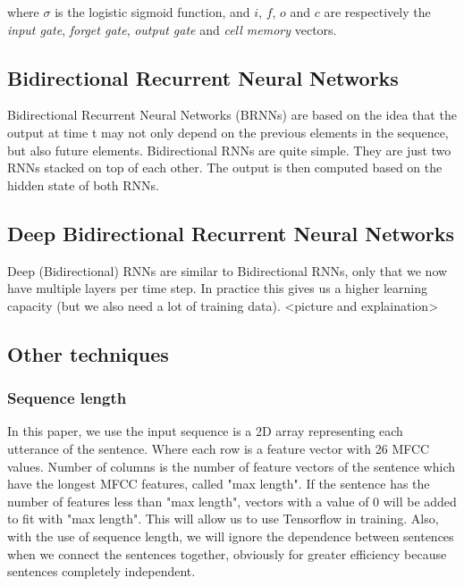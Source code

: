 \documentclass[conference]{IEEEtran}
\begin{document}
where $\sigma$ is the logistic sigmoid function, and $i$, $f$, $o$ and $c$ are respectively the \textit{input gate}, \textit{forget gate}, \textit{output gate} and \textit{cell memory} vectors.









\subsection{Bidirectional Recurrent Neural Networks}
Bidirectional Recurrent Neural Networks (BRNNs) are based on the idea that the output at time t may not only depend on the previous elements in the sequence, but also future elements. Bidirectional RNNs are quite simple. They are just two RNNs stacked on top of each other. The output is then computed based on the hidden state of both RNNs.




\subsection{Deep Bidirectional Recurrent Neural Networks}
Deep (Bidirectional) RNNs are similar to Bidirectional RNNs, only that we now have multiple layers per time step. In practice this gives us a higher learning capacity (but we also need a lot of training data).
<picture and explaination>

\subsection{Other techniques}
\subsubsection{Sequence length}

In this paper, we use the input sequence is a 2D array representing each utterance of the sentence. Where each row is a feature vector with 26 MFCC values. Number of columns is the number of feature vectors of the sentence which have the longest MFCC features, called "max length". If the sentence has the number of features less than "max length", vectors with a value of 0 will be added to fit with "max length". This will allow us to use Tensorflow in training. Also, with the use of sequence length, we will ignore the dependence between sentences when we connect the sentences together, obviously for greater efficiency because sentences completely independent.
\end{document}
